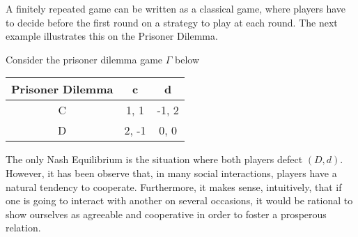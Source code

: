 A finitely repeated game can be written as a classical game, where players have to decide before the first round on a strategy to play at each round.
The next example illustrates this on the Prisoner Dilemma.
\begin{example}
\label{ch9:ex:PD1}
Consider the prisoner dilemma game $\Gamma$ below
\begin{center}
\begin{tabular}{c|cc}
 Prisoner Dilemma & c & d \\
\hline
C & 1, 1 & -1, 2 \\
D & 2, -1 & 0, 0
\end{tabular}
\end{center}
The only Nash Equilibrium is the situation where both players defect $(D,d)$. However, it has been observe that, in many social interactions, players have a natural tendency to cooperate.
Furthermore, it makes sense, intuitively, that if one is going to interact with another on several occasions, it would be rational to show ourselves as agreeable and cooperative in order to foster a prosperous relation.


\end{example}
